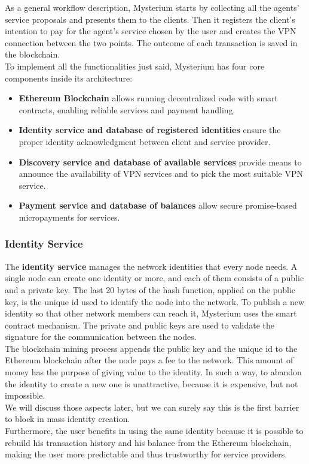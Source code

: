 \documentclass[12pt]{article}
\begin{document}
	As a general workflow description, Mysterium starts by collecting all the agents' service proposals and presents them to the clients. Then it registers the client's intention to pay for the agent's service chosen by the user and creates the VPN connection between the two points. The outcome of each transaction is saved in the blockchain.\\
	
	\bigbreak
	To implement all the functionalities just said, Mysterium has four core components inside its architecture:
	\begin{itemize}
		\item \textbf{Ethereum Blockchain} allows running decentralized code with smart contracts, enabling reliable services and payment handling.
		\item \textbf{Identity service and database of registered identities} ensure the proper identity acknowledgment between client and service provider.
		\item \textbf{Discovery service and database of available services} provide means to announce the availability of VPN services and to pick the most suitable VPN service.
		\item \textbf{Payment service and database of balances} allow secure promise-based micropayments for services.
	\end{itemize}

	\subsubsection{Identity Service}

	The \textbf{identity service} manages the network identities that every node needs. A single node can create one identity or more, and each of them consists of a public and a private key. The last 20 bytes of the hash function, applied on the public key, is the unique id used to identify the node into the network. To publish a new identity so that other network members can reach it, Mysterium uses the smart contract mechanism. The private and public keys are used to validate the signature for the communication between the nodes.\\
	The blockchain mining process appends the public key and the unique id to the Ethereum blockchain after the node pays a fee to the network. This amount of money has the purpose of giving value to the identity. In such a way,  to abandon the identity to create a new one is unattractive, because it is expensive, but not impossible.\\ 
	We will discuss those aspects later, but we can surely say this is the first barrier to block in mass identity creation.\\
	Furthermore, the user benefits in using the same identity because it is possible to rebuild his transaction history and his balance from the Ethereum blockchain, making the user more predictable and thus trustworthy for service providers.\\
\end{document}
